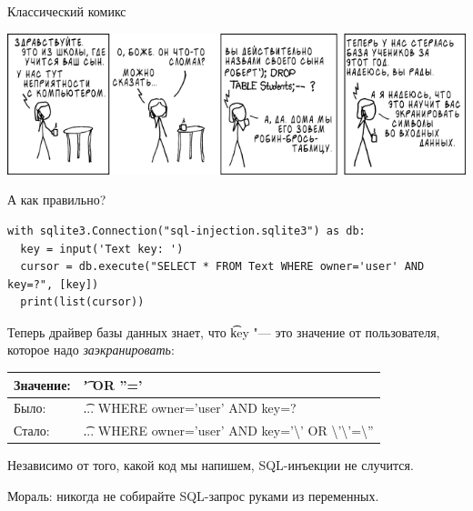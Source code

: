 \begin{frame}{Классический комикс}
	\begin{center}
		\includegraphics[scale=0.5]{xkcd-327.png}
	\end{center}
\end{frame}

\begin{frame}[fragile]{А как правильно?}
\begin{verbatim}
with sqlite3.Connection("sql-injection.sqlite3") as db:
  key = input('Text key: ')
  cursor = db.execute("SELECT * FROM Text WHERE owner='user' AND key=?", [key])
  print(list(cursor))
\end{verbatim}
	Теперь драйвер базы данных знает, что \t{key} "--- это значение от пользователя,
	которое надо \textit{заэкранировать}:
	\begin{center}
		\begin{tabular}{ll}
			Значение: & \t{' OR ''='} \\\hline
			Было:  & \t{... WHERE owner='user' AND key=?} \\\hline
			Стало: & \t{... WHERE owner='user' AND key='\textbackslash' OR  \textbackslash'\textbackslash'=\textbackslash''} \\
		\end{tabular}
	\end{center}
	Независимо от того, какой код мы напишем, SQL-инъекции не случится.

	Мораль: никогда не собирайте SQL-запрос руками из переменных.
\end{frame}
